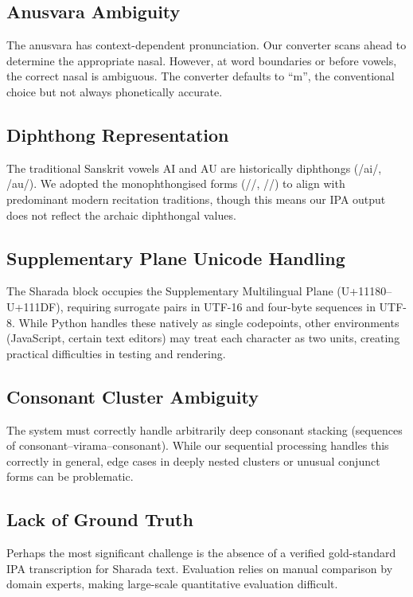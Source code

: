 \documentclass[11pt]{article}
\begin{document}
\subsection{Anusvara Ambiguity}
The anusvara has context-dependent pronunciation. Our converter scans ahead to determine the appropriate nasal. However, at word boundaries or before vowels, the correct nasal is ambiguous. The converter defaults to ``m'', the conventional choice but not always phonetically accurate.

\subsection{Diphthong Representation}
The traditional Sanskrit vowels AI and AU are historically diphthongs (/ai/, /au/). We adopted the monophthongised forms (/\textlengthmark/, /\textlengthmark/) to align with predominant modern recitation traditions, though this means our IPA output does not reflect the archaic diphthongal values.

\subsection{Supplementary Plane Unicode Handling}
The Sharada block occupies the Supplementary Multilingual Plane (U+11180--U+111DF), requiring surrogate pairs in UTF-16 and four-byte sequences in UTF-8. While Python handles these natively as single codepoints, other environments (JavaScript, certain text editors) may treat each character as two units, creating practical difficulties in testing and rendering.

\subsection{Consonant Cluster Ambiguity}
The system must correctly handle arbitrarily deep consonant stacking (sequences of consonant--virama--consonant). While our sequential processing handles this correctly in general, edge cases in deeply nested clusters or unusual conjunct forms can be problematic.

\subsection{Lack of Ground Truth}
Perhaps the most significant challenge is the absence of a verified gold-standard IPA transcription for Sharada text. Evaluation relies on manual comparison by domain experts, making large-scale quantitative evaluation difficult.
\end{document}

